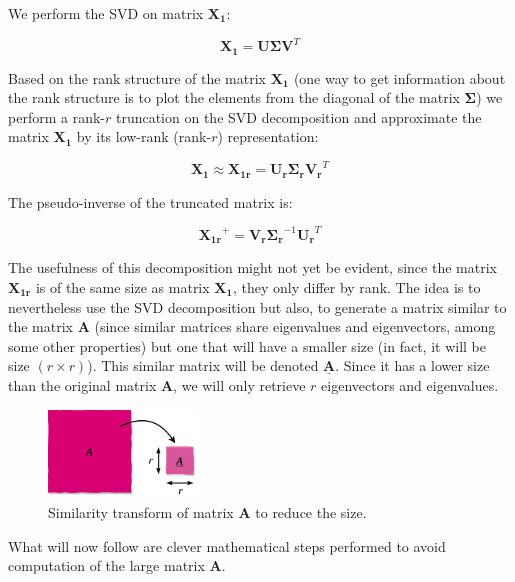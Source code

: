 \documentclass[10pt,twocolumn]{article}
\begin{document}
We perform the SVD on matrix $\bm{X_1}$:

\begin{equation} \label{eq:solution}
\bm{X_1} = \bm{U} \bm{\Sigma} \bm{V}^T 
\end{equation}

Based on the rank structure of the matrix $\bm{X_1}$ (one way to get information about the rank structure is to plot the elements from the diagonal of the matrix $\bm{\Sigma}$) we perform a rank-$r$ truncation on the SVD decomposition and approximate the matrix $\bm{X_1}$ by its low-rank (rank-$r$) representation:

\begin{equation} \label{eq:solution-approx}
\bm{X_1} \approx \bm{X_{1r}} = \bm{U_r} \bm{\Sigma_r} \bm{V_r}^T 
\end{equation}

The pseudo-inverse of the truncated matrix is:

\begin{equation} \label{eq:pseudo-inverse}
\bm{X_{1r}}^{+} = \bm{V_r}  \bm{\Sigma_r}^{-1} \bm{U_r}^T
\end{equation}

The usefulness of this decomposition might not yet be evident, since the matrix $\bm{X_{1r}}$ is of the same size as matrix $\bm{X_{1}}$, they only differ by rank. The idea is to nevertheless use the SVD decomposition but also, to generate a matrix similar to the matrix $\bm{A}$ (since similar matrices share eigenvalues and eigenvectors, among some other properties) but one that will have a smaller size (in fact, it will be size $(r \times r)$). This similar matrix will be denoted $\underline{\bm{A}}$. Since it has a lower size than the original matrix $\bm{A}$, we will only retrieve $r$ eigenvectors and eigenvalues.

\begin{figure}
\centering\includegraphics[width=4cm]{similar-matrices.png}
\caption{Similarity transform of matrix $\bm{A}$ to reduce the size.}
\label{fig:similar-matrices}
\end{figure}

What will now follow are clever mathematical steps performed to avoid computation of the large matrix $\bm{A}$.
\end{document}
